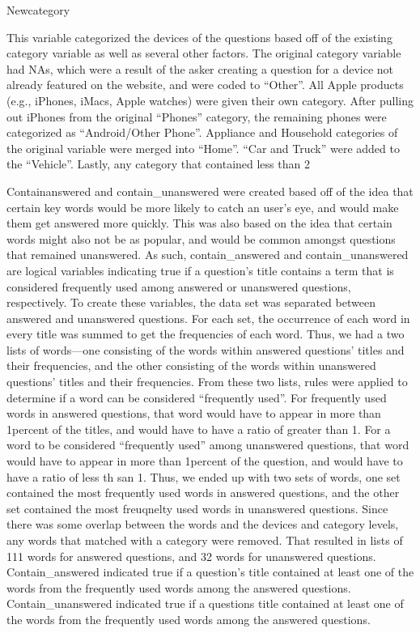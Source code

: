 \documentclass[12pt]{article}
\begin{document}
Newcategory 

This variable categorized the devices of the questions based off of the existing category variable as well as several other factors. The original category variable had NAs, which were a result of the asker creating a question for a device not already featured on the website, and were coded to “Other”. All Apple products (e.g., iPhones, iMacs, Apple watches) were given their own category. After pulling out iPhones from the original “Phones” category, the remaining phones were categorized as “Android/Other Phone”. Appliance and Household categories of the original variable were merged into “Home”. “Car and Truck” were added to the “Vehicle”. Lastly, any category that contained less than 2%

Containanswered and contain_unanswered were created based off of the idea that certain key words would be more likely to catch an user’s eye, and would make them get answered more quickly. This was also based on the idea that certain words might also not be as popular, and would be common amongst questions that remained unanswered. As such, contain_answered and contain_unanswered are logical variables indicating true if a question’s title contains a term that is considered frequently used among answered or unanswered questions, respectively. To create these variables, the data set was separated between answered and unanswered questions. For each set, the occurrence of each word in every title was summed to get the frequencies of each word. Thus, we had a two lists of words—one consisting of the words within answered questions’ titles and their frequencies, and the other consisting of the words within unanswered questions’ titles and their frequencies. From these two lists, rules were applied to determine if a word can be considered “frequently used”.  For frequently used words in answered questions, that word would have to appear in more than 1percent of the titles, and would have to have a ratio of greater than 1. For a word to be considered “frequently used” among unanswered questions, that word would have to appear in more than 1percent of the question, and would have to have a ratio of less th san 1. Thus, we ended up with two sets of words, one set contained the most frequently used words in answered questions, and the other set contained the most freuqnelty used words in unanswered questions. Since there was some overlap between the words and the devices and category levels, any words that matched with a category were removed. That resulted in lists of 111 words for answered questions, and 32 words for unanswered questions. Contain_answered indicated true if a question’s title contained at least one of the words from the frequently used words among the answered questions. Contain_unanswered indicated true if a questions title contained at least one of the words from the frequently used words among the answered questions. 
\end{document}
